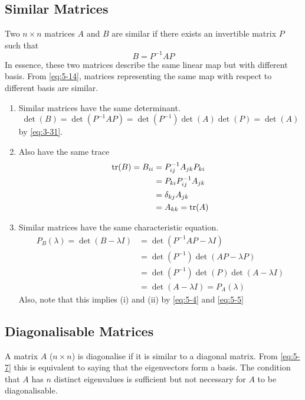 \documentclass{article}
\numberwithin{equation}{section}
\begin{document}
\subsection{Similar Matrices}
\begin{defi}
    Two $n \times n$ matrices $A$ and $B$ are similar if there exists an invertible matrix $P$ such that
    \begin{equation}\label{eq:5-16}
        B = P^{-1}AP
    \end{equation}
    In essence, these two matrices describe the same linear map but with different basis.
    From \eqref{eq:5-14}, matrices representing the same map with respect to different basis are similar.
\end{defi}
\begin{remark}\leavevmode
    \begin{enumerate}
        \item Similar matrices have the same determinant.
        \[
            \det(B) = \det(P^{-1}AP) = \det(P^{-1}) \det(A) \det(P) = \det(A)
        \]
        by \eqref{eq:3-31}.
        
        \item Also have the same trace
        \begin{align*}
            \operatorname{tr}(B) = B_{ii} &= P^{-1}_{ij}A_{jk}P_{ki} \\
            &= P_{ki}P^{-1}_{ij}A_{jk} \\
            &= \delta_{kj}A_{jk} \\
            &= A_{kk} = \operatorname{tr}(A)
        \end{align*}

        \item Similar matrices have the same characteristic equation.
        \begin{align*}
            P_B(\lambda) = \det(B - \lambda I) &= \det(P^{-1}AP - \lambda I) \\
            &= \det(P^{-1}) \det(AP - \lambda P) \\
            &= \det(P^{-1}) \det(P) \det(A - \lambda I) \\
            &= \det(A - \lambda I) = P_A(\lambda)
        \end{align*}
        Also, note that this implies (i) and (ii) by \eqref{eq:5-4} and \eqref{eq:5-5}
    \end{enumerate}
\end{remark}
\subsection{Diagonalisable Matrices}
A matrix $A$ ($n \times n$) is diagonalise if it is similar to a diagonal matrix. 
From \eqref{eq:5-7} this is equivalent to saying that the eigenvectors form a basis.
The condition that $A$ has $n$ distinct eigenvalues is sufficient but not necessary for $A$ to be diagonalisable.
\end{document}
